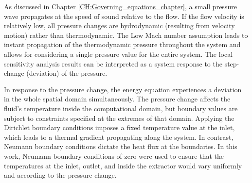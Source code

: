 \documentclass[../Article_Sensitivity_Analsysis.tex]{subfiles}
\begin{document}
	
	
	As discussed in Chapter \ref{CH:Governing_equations_chapter}, a small pressure wave propagates at the speed of sound relative to the flow. If the flow velocity is relatively low, all pressure changes are hydrodynamic (resulting from velocity motion) rather than thermodynamic. The Low Mach number assumption leads to instant propagation of the thermodynamic pressure throughout the system and allows for considering a single pressure value for the entire system. The local sensitivity analysis results can be interpreted as a system response to the step-change (deviation) of the pressure. 
	
	\begin{comment}
	\begin{figure}[h!]
		\centering
		\texttt{[image: /Results\_sensitivity/P\_P\_1.png]}
		\caption{The effect of $P_{in}$ change on $P$}
		\label{fig:Sensitivty_P_P}
	\end{figure}
	\end{comment}
	
	In response to the pressure change, the energy equation experiences a deviation in the whole spatial domain simultaneously. The pressure change affects the fluid's temperature inside the computational domain, but boundary values are subject to constraints specified at the extremes of that domain. Applying the Dirichlet boundary conditions imposes a fixed temperature value at the inlet, which leads to a thermal gradient propagating along the system. In contrast, Neumann boundary conditions dictate the heat flux at the boundaries. In this work, Neumann boundary conditions of zero were used to ensure that the temperatures at the inlet, outlet, and inside the extractor would vary uniformly and according to the pressure change.
	
	\begin{comment}
	\begin{figure}[h!]
		\centering
		\texttt{[image: /Results\_sensitivity/H\_P\_1.png]}
		\caption{The effect of $P_{in}$ change on $(h \times \rho)$}
		\label{fig:Sensitivty_P_H}
	\end{figure}
	\end{comment}
	
\end{document}
